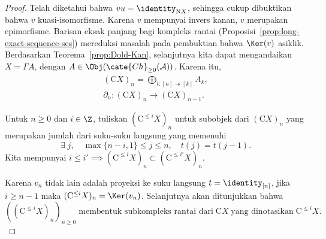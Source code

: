 \begin{proof}
	Telah diketahui bahwa $vu=\identity_{\mathrm{N}X}$, sehingga cukup
	dibuktikan bahwa $v$ kuasi-isomorfisme. Karena $v$ mempunyai invers kanan,
	$v$ merupakan epimorfisme. Barisan eksak panjang bagi kompleks rantai
	(Proposisi~\ref{prop:long-exact-sequence-ses}) mereduksi masalah pada
	pembuktian bahwa $\Ker(v)$ asiklik. Berdasarkan
	Teorema~\ref{prop:Dold-Kan}, selanjutnya kita dapat mengandaikan
	$X=\Gamma A$, dengan
	$A\in\Obj(\cate{Ch}_{\geq0}(\mathcal{A}))$. Karena itu,
	\begin{gather*}
		(\mathrm{C}X)_n = \bigoplus_{t: [n] \twoheadrightarrow [k]} A_k, \\
		\partial_n : (\mathrm{C}X)_n \to (\mathrm{C}X)_{n-1}.
	\end{gather*}

	Untuk $n\geq0$ dan $i\in\Z$, tuliskan
	$(\mathrm{C}^{\leq i}X)_n$ untuk subobjek dari $(\mathrm{C}X)_n$ yang
	merupakan jumlah dari suku-suku langsung yang memenuhi
	\[ \exists \; j, \quad \max\{n-i, 1\} \leq j \leq n, \quad t(j) = t(j-1). \]
	Kita mempunyai
	$i\leq i'\implies(\mathrm{C}^{\leq i}X)_n\subset
	(\mathrm{C}^{\leq i'}X)_n$.

	Karena $v_n$ tidak lain adalah proyeksi ke suku langsung
	$t=\identity_{[n]}$, jika $i\geq n-1$ maka
	$(\mathrm{C}^{\leq i}X)_n=\Ker(v_n)$. Selanjutnya akan ditunjukkan bahwa
	\begin{equation}\label{eqn:Dold-Kan-N-C-aux0}
		\left( (\mathrm{C}^{\leq i} X)_n \right)_{n \geq 0} \;\text{membentuk subkompleks rantai dari}\; \mathrm{C}X \;\text{yang dinotasikan}\; \mathrm{C}^{\leq i} X.
	\end{equation}


\end{proof}

